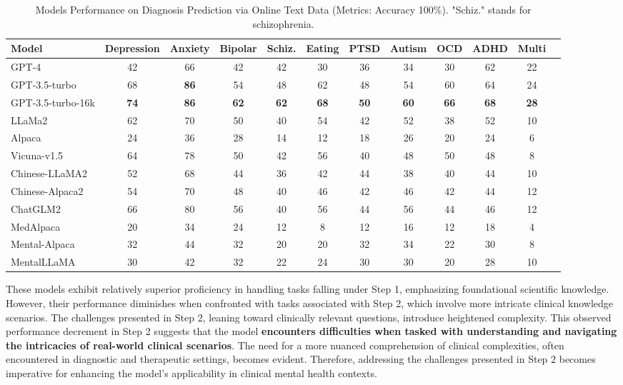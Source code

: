 \begin{table*}[t]
\centering
\footnotesize
\begin{tabular}{l c c c c c c c c c c c}
\hline
\textbf{Model} & \textbf{Depression} & \textbf{Anxiety} & \textbf{Bipolar} & \textbf{Schiz.} & \textbf{Eating} & \textbf{PTSD} & \textbf{Autism} & \textbf{OCD} & \textbf{ADHD} & \textbf{Multi}\\
\hline
GPT-4 & 42 & 66 & 42 & 42 & 30 & 36 & 34 & 30 & 62 & 22\\
GPT-3.5-turbo & 68 & \textbf{86} & 54 & 48 & 62 & 48 & 54 & 60 & 64 & 24\\
GPT-3.5-turbo-16k & \textbf{74} & \textbf{86} & \textbf{62} & \textbf{62} & \textbf{68} & \textbf{50} & \textbf{60} & \textbf{66} & \textbf{68} & \textbf{28}\\
\hline
LLaMa2 & 62 & 70 & 50 & 40 & 54 & 42 & 52 & 38 & 52 & 10\\
Alpaca & 24 & 36 & 28 & 14 & 12 & 18 & 26 & 20 & 24 & 6\\
Vicuna-v1.5 & 64 & 78 & 50 & 42 & 56 & 40 & 48 & 50 & 48 & 8\\
\hline
Chinese-LLaMA2 & 52 & 68 & 44 & 36 & 42 & 44 & 38 & 40 & 44 & 10\\
Chinese-Alpaca2 & 54 & 70 & 48 & 40 & 46 & 42 & 46 & 42 & 44 & 12\\
ChatGLM2 & 66 & 80 & 56 & 40 & 56 & 44 & 56 & 44 & 46 & 12\\
\hline
MedAlpaca & 20 & 34 & 24 & 12 & 8 & 12 & 16 & 12 & 18 & 4\\
Mental-Alpaca & 32 & 44 & 32 & 20 & 20 & 32 & 34 & 22 & 30 & 8\\
MentalLLaMA & 30 & 42 & 32 & 22 & 24 & 30 & 30 & 20 & 28 & 10\\
\hline
\end{tabular}
\caption{Models Performance on Diagnosis Prediction via Online Text Data (Metrics: Accuracy 100\%). "Schiz." stands for schizophrenia.%
}
\label{tab: SMHD}
\end{table*}
These models exhibit relatively superior proficiency in handling tasks falling under Step 1, emphasizing foundational scientific knowledge. However, their performance diminishes when confronted with tasks associated with Step 2, which involve more intricate clinical knowledge scenarios. The challenges presented in Step 2, leaning toward clinically relevant questions, introduce heightened complexity. This observed performance decrement in Step 2 suggests that the model \textbf{encounters difficulties when tasked with understanding and navigating the intricacies of real-world clinical scenarios}. The need for a more nuanced comprehension of clinical complexities, often encountered in diagnostic and therapeutic settings, becomes evident. Therefore, addressing the challenges presented in Step 2 becomes imperative for enhancing the model's applicability in clinical mental health contexts.


